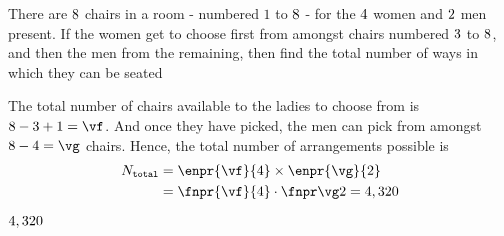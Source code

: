 



\SUBTRACT\va\vb\vg

\question[2] There are $8$ chairs in a room - numbered $1$ to $8$ - for the $4$ women and $2$ men present.
If the women get to choose first from amongst chairs numbered $3$ to $8$, and then the men 
from the remaining, then find the total number of ways in which they can be seated


\watchout[-45pt]

\begin{solution}[\mcq]
	The total number of chairs available to the ladies to choose from is $\ve - \vd + 1 = \vf$.
	And once they have picked, the men can pick from amongst $\va - \vb = \vg$ chairs. Hence,
	the total number of arrangements possible is
	\begin{align}
		N_{\texttt{total}} &= \enpr{\vf}{\vb} \times \enpr{\vg}{\vc} \\
		&= \fnpr{\vf}{\vb} \cdot \fnpr\vg\vc = \vh
	\end{align}
\end{solution}

\ifprintanswers
  \begin{codex}
    $4,320$
  \end{codex}
\fi 


